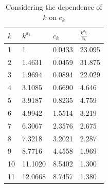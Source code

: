 \documentclass[12pt]{report}
\begin{document}
\begin{table}
\caption{Considering the dependence of $k$ on $c_{k}$} \label{normal_dependentk}
\begin{center}
\begin{tabular}{| l | l l l |} 
\toprule
$k$ &  $k^{a_{k}}$ & $c_{k}$ & $\frac{k^{a_{k}}}{c_{k}}$ \\
\midrule[1pt]
1  & 1 & 0.0433 & 23.095 \\
2  & 1.4631 & 0.0459 & 31.875 \\
3  & 1.9694 & 0.0894 & 22.029 \\
4  & 3.1085 & 0.6690 & 4.646 \\
5  & 3.9187 & 0.8235 & 4.759 \\
6  & 4.9942 & 1.5514 & 3.219 \\
7  & 6.3067 & 2.3576 & 2.675 \\
8  & 7.3218 & 3.2021 & 2.287 \\
9  & 8.7716 & 4.4558 & 1.969 \\
10 & 11.1020 & 8.5402 & 1.300 \\
11 & 12.0668 & 8.7457 & 1.380 \\
\hline
\end{tabular}
\\[10pt]
\end{center}
\end{table}
\end{document}
